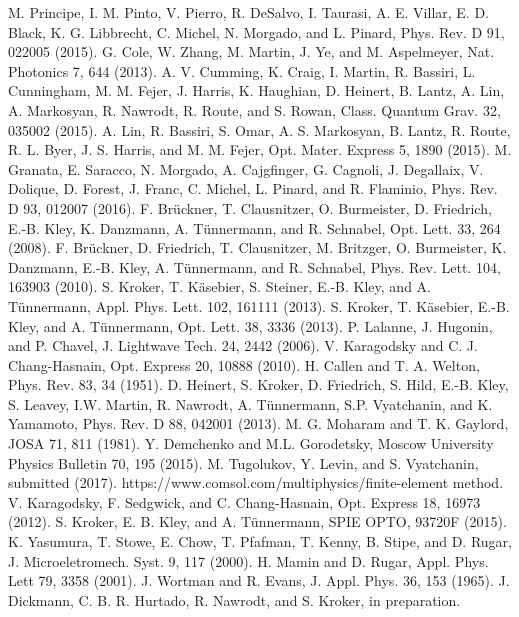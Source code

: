 \documentclass[twocolumn,secnumarabic,amssymb, nobibnotes, aps, prd, showpacs]{revtex4-1}
\begin{document}
\begin{thebibliography}{99}
M. Principe, I. M. Pinto, V. Pierro, R. DeSalvo, I. Taurasi, A. E. Villar, E. D. Black, K. G. Libbrecht, C. Michel, N. Morgado, and L. Pinard, Phys. Rev. D 91, 022005 (2015).
G. Cole, W. Zhang, M. Martin, J. Ye, and M. Aspelmeyer, Nat. Photonics 7, 644 (2013).
A. V. Cumming, K. Craig, I. Martin, R. Bassiri, L. Cunningham, M. M. Fejer, J. Harris, K. Haughian, D. Heinert, B. Lantz, A. Lin, A. Markosyan, R. Nawrodt, R. Route, and S. Rowan, Class. Quantum Grav. 32, 035002 (2015).
A. Lin, R. Bassiri, S. Omar, A. S. Markosyan, B. Lantz, R. Route, R. L. Byer, J. S. Harris, and M. M. Fejer, Opt. Mater. Express 5, 1890 (2015).
M. Granata, E. Saracco, N. Morgado, A. Cajgfinger, G. Cagnoli, J. Degallaix, V. Dolique, D. Forest, J. Franc, C. Michel, L. Pinard, and R. Flaminio, Phys. Rev. D 93, 012007 (2016).
F. Br\"uckner, T. Clausnitzer, O. Burmeister, D. Friedrich, E.-B. Kley, K. Danzmann, A. T\"unnermann, and R. Schnabel, Opt. Lett. 33, 264 (2008).
F. Br\"uckner, D. Friedrich, T. Clausnitzer, M. Britzger, O. Burmeister, K. Danzmann, E.-B. Kley, A. T\"unnermann, and R. Schnabel, Phys. Rev. Lett. 104, 163903 (2010).
S. Kroker, T. K\"asebier, S. Steiner, E.-B. Kley, and A. T\"unnermann, Appl. Phys. Lett. 102, 161111 (2013).
S. Kroker, T. K\"asebier, E.-B. Kley, and A. T\"unnermann, Opt. Lett. 38, 3336 (2013).
P. Lalanne, J. Hugonin, and P. Chavel, J. Lightwave Tech. 24, 2442 (2006).
V. Karagodsky and C. J. Chang-Hasnain, Opt. Express 20, 10888 (2010).
H. Callen and T. A. Welton, Phys. Rev. 83, 34 (1951).
D. Heinert, S. Kroker, D. Friedrich, S. Hild, E.-B. Kley, S. Leavey, I.W. Martin, R. Nawrodt, A. T\"unnermann, S.P. Vyatchanin, and K. Yamamoto, Phys. Rev. D 88, 042001 (2013).
M. G. Moharam and T. K. Gaylord, JOSA 71, 811 (1981).
Y. Demchenko and M.L. Gorodetsky, Moscow University Physics Bulletin 70, 195 (2015).
M. Tugolukov, Y. Levin, and S. Vyatchanin, submitted (2017).
https://www.comsol.com/multiphysics/finite-element method.
V. Karagodsky, F. Sedgwick, and C. Chang-Hasnain, Opt. Express 18, 16973 (2012).
S. Kroker, E. B. Kley, and A. T\"unnermann, SPIE OPTO, 93720F (2015).
K. Yasumura, T. Stowe, E. Chow, T. Pfafman, T. Kenny, B. Stipe, and D. Rugar, J. Microeletromech. Syst. 9, 117 (2000).
H. Mamin and D. Rugar, Appl. Phys. Lett 79, 3358 (2001).
J. Wortman and R. Evans, J. Appl. Phys. 36, 153 (1965).
J. Dickmann, C. B. R. Hurtado, R. Nawrodt, and S. Kroker, in preparation.
\end{thebibliography}
\end{document}
